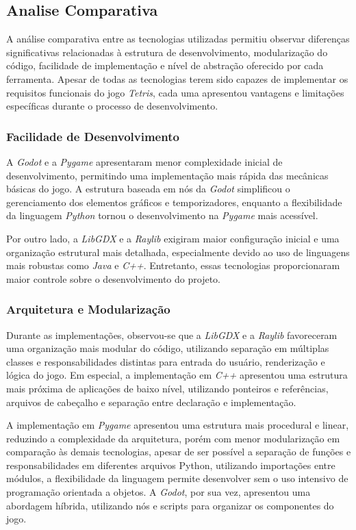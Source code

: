 \subsection{Analise Comparativa}

A análise comparativa entre as tecnologias utilizadas permitiu observar diferenças significativas relacionadas à estrutura de desenvolvimento, modularização do código, facilidade de implementação e nível de abstração oferecido por cada ferramenta. Apesar de todas as tecnologias terem sido capazes de implementar os requisitos funcionais do jogo \textit{Tetris}, cada uma apresentou vantagens e limitações específicas durante o processo de desenvolvimento.

\subsubsection{Facilidade de Desenvolvimento}

A \textit{Godot} e a \textit{Pygame} apresentaram menor complexidade inicial de desenvolvimento, permitindo uma implementação mais rápida das mecânicas básicas do jogo. A estrutura baseada em nós da \textit{Godot} simplificou o gerenciamento dos elementos gráficos e temporizadores, enquanto a flexibilidade da linguagem \textit{Python} tornou o desenvolvimento na \textit{Pygame} mais acessível.

Por outro lado, a \textit{LibGDX} e a \textit{Raylib} exigiram maior configuração inicial e uma organização estrutural mais detalhada, especialmente devido ao uso de linguagens mais robustas como \textit{Java} e \textit{C++}. Entretanto, essas tecnologias proporcionaram maior controle sobre o desenvolvimento do projeto.

\subsubsection{Arquitetura e Modularização}

Durante as implementações, observou-se que a \textit{LibGDX} e a \textit{Raylib} favoreceram uma organização mais modular do código, utilizando separação em múltiplas classes e responsabilidades distintas para entrada do usuário, renderização e lógica do jogo. Em especial, a implementação em \textit{C++} apresentou uma estrutura mais próxima de aplicações de baixo nível, utilizando ponteiros e referências, arquivos de cabeçalho e separação entre declaração e implementação.

A implementação em \textit{Pygame} apresentou uma estrutura mais procedural e linear, reduzindo a complexidade da arquitetura, porém com menor modularização em comparação às demais tecnologias, apesar de ser possível a separação de funções e responsabilidades em diferentes arquivos Python, utilizando importações entre módulos, a flexibilidade da linguagem permite desenvolver sem o uso intensivo de programação orientada a objetos. A \textit{Godot}, por sua vez, apresentou uma abordagem híbrida, utilizando nós e scripts para organizar os componentes do jogo.


